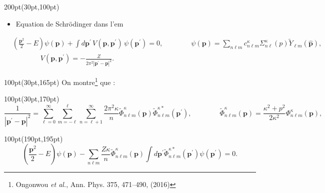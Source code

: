 \begin{frame}
\begin{textblock*}{200pt}(30pt,100pt)
\footnotesize
\begin{itemize}
\item Equation de Schr\"odinger dans l'\acrshort{em}
\end{itemize}
\begin{equation*}
 \begin{split}
& \left( \frac{\boldsymbol{p}^2}{2} - E \right) \psi(\boldsymbol{p})
   + \int d\boldsymbol{p}^\prime\,V(\boldsymbol{p},\boldsymbol{p}^\prime)\,
     \psi(\boldsymbol{p^\prime}) =  0, \qquad
\qquad \psi(\boldsymbol{p}) = \sum_{n\ell m} c_{n\ell m}^\kappa 
 \Sigma_{n\ell}^\kappa (p) \widetilde{Y}_{\ell m}({\boldsymbol{\hat{p}}}), \\
&\qquad\qquad  V(\boldsymbol{p},\boldsymbol{p^\prime}) 
  = -\frac{Z}{2\pi^2\left| \boldsymbol{p^\prime}-\boldsymbol{p}\right|^2}.
      \label{eqn:schrodinger_moment}
\end{split}
\end{equation*}

\end{textblock*}

\begin{textblock*}{100pt}(30pt,165pt)
\footnotesize
On montre\footnote{\Tiny 
Ongonwou \textit{et al.}, Ann. Phys. 375, 471–490, (2016)} que :
\end{textblock*}

\begin{textblock*}{100pt}(30pt,170pt)
\footnotesize
\begin{equation*}
   \frac{1}{\left| \boldsymbol{p^\prime}-\boldsymbol{p}\right|^2}
  = \sum_{\ell=0}^\infty \sum_{m=-\ell}^\ell \sum_{n=\ell+1}^\infty
   \frac{2\pi^2\kappa}{n} \widetilde{\Phi}_{n\ell m}^\kappa (\boldsymbol{p}) 
   \widetilde{\Phi}_{n\ell m}^{\kappa\ast} (\boldsymbol{p^\prime}),
 \qquad\qquad \widetilde{\Phi}_{n\ell m}^\kappa (\boldsymbol{p})= \frac{\kappa^2+p^2}{2\kappa^2}{\Phi}_{n\ell m}^\kappa (\boldsymbol{p}),
\end{equation*}
\end{textblock*}


\begin{textblock*}{100pt}(190pt,195pt)
\small
\begin{equation*}
   \left(\frac{\boldsymbol{p}^2}{2}-E\right) \psi(\boldsymbol{p})
  - \sum_{n\ell m} \frac{Z\kappa}{n} \widetilde{\Phi}_{n\ell m}^\kappa (\boldsymbol{p}) \int d\boldsymbol{p^\prime} \widetilde{\Phi}_{n\ell m}^{\kappa\ast} (\boldsymbol{p^\prime}) \psi(\boldsymbol{p^\prime}) = 0.
\end{equation*}
\end{textblock*}

\end{frame}


